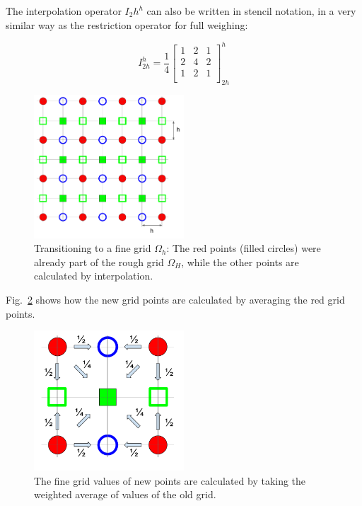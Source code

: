 The interpolation operator $I_2h^h$ can also be written in stencil notation, in a very similar way as the restriction operator for full weighing:

\begin{equation}
I_{2h}^h = \frac{1}{4} \begin{bmatrix}
1 & 2 & 1\\
2 & 4 & 2\\
1 & 2 & 1\\
\end{bmatrix}_{2h}^{h} 
\end{equation}

\begin{figure}[h]
	\centering
	\includegraphics[width=0.5\textwidth]{chapters/chapter02/mg_prolongation_grid}
	\caption{Transitioning to a fine grid $\Omega_h$: The red points (filled circles) were already part of the rough grid $\Omega_H$, while the other points are calculated by interpolation.}
	\label{fig:mg_prolongation_grid}
\end{figure}

Fig.~\ref{fig:mg_prolongation} shows how the new grid points are calculated by averaging the red grid points.

\begin{figure}[h]
	\centering
	\includegraphics[width=0.5\textwidth]{chapters/chapter02/mg_prolongation}
	\caption{The fine grid values of new points are calculated by taking the weighted average of values of the old grid.}
	\label{fig:mg_prolongation}
\end{figure}


